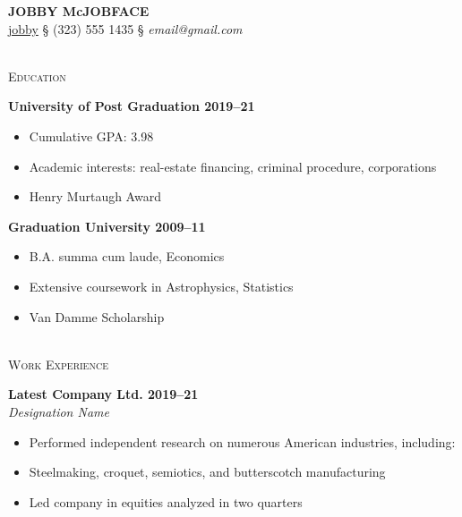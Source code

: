 \documentclass[11pt]{article}
\newcommand{\linehead}[1]	%
	{\vspace{5mm} 
	{\color{cvColour}
	\hrulefill \\ 
	{\large 
	\textsc{{#1}}}}}
\newcommand{\bighead}[1]	%
	{\vspace{5mm} 
	{\large 
	{\textbf {#1}}}}
\newcommand{\ithead}[1]		%
	{{\large 
	{\textit {#1}}}}
\begin{document}
\begin{center}
    {\huge \color{cvColour} \textbf{JOBBY McJOBFACE}} \\
    \vspace{3mm}
    \faLinkedinIn \href{https://www.linkedin.com/company/linkedin}{jobby}
    {\color{Gray} \S}
    \faMobile*(323) 555 1435  
    {\color{Gray} \S}
    \faEnvelope[regular] \textit{email@gmail.com}
\end{center} 

\vspace{-5mm}


\linehead{Education}

\bighead{University of Post Graduation \hfill 2019–21}
\begin{itemize}
    \item Cumulative GPA: 3.98
    \item Academic interests: real-estate financing, criminal procedure, corporations
    \item Henry Murtaugh Award
\end{itemize}

\bighead{Graduation University \hfill 2009–11}
\begin{itemize}
    \item B.A. summa cum laude, Economics
    \item Extensive coursework in Astrophysics, Statistics
    \item Van Damme Scholarship
\end{itemize}



\linehead{Work Experience}

\bighead{Latest Company Ltd. \hfill 2019–21} \\
\ithead{Designation Name}
\begin{itemize}
    \item Performed independent research on numerous American industries, including:
    \item Steelmaking, croquet, semiotics, and butterscotch manufacturing
    \item Led company in equities analyzed in two quarters
\end{itemize}

\end{document}
